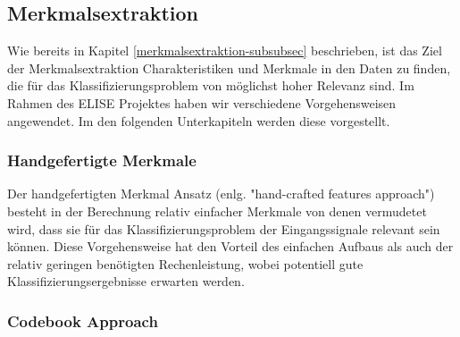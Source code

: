 \subsection{Merkmalsextraktion} \label{merkmalsextraftion-1-subsec}

Wie bereits in Kapitel \ref{merkmalsextraktion-subsubsec} beschrieben, ist das Ziel der Merkmalsextraktion Charakteristiken und Merkmale in den Daten zu finden, die für das
Klassifizierungsproblem von möglichst hoher Relevanz sind. Im Rahmen des ELISE Projektes haben wir verschiedene Vorgehensweisen angewendet. Im den folgenden Unterkapiteln werden diese vorgestellt. \\



\subsubsection{Handgefertigte Merkmale} \label{hc-features-1-subsubsection}
Der handgefertigten Merkmal Ansatz (enlg. "hand-crafted features approach") besteht in der Berechnung relativ einfacher Merkmale von denen vermudetet wird, dass sie für das Klassifizierungsproblem der Eingangssignale relevant sein können. Diese Vorgehensweise hat den Vorteil des einfachen Aufbaus als auch der relativ geringen benötigten Rechenleistung, wobei potentiell gute Klassifizierungsergebnisse erwarten werden. \\






\subsubsection{Codebook Approach} \label{ca-1-subsubsection}

